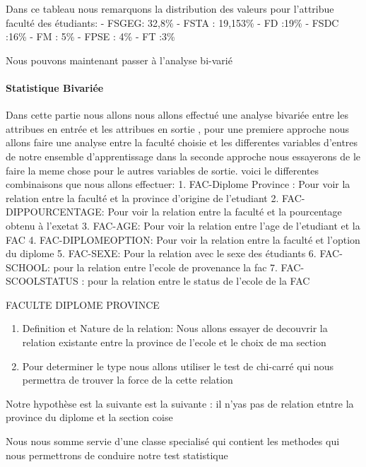 \documentclass[11pt]{article}
\providecommand{\tightlist}{%
      \setlength{\itemsep}{0pt}\setlength{\parskip}{0pt}}
\begin{document}
    Dans ce tableau nous remarquons la distribution des valeurs pour
l'attribue faculté des étudiants: - FSGEG: 32,8\% - FSTA : 19,153\% - FD
:19\% - FSDC :16\% - FM : 5\% - FPSE : 4\% - FT :3\%

    Nous pouvons maintenant passer à l'analyse bi-varié

    \paragraph{Statistique Bivariée}\label{statistique-bivariuxe9e}

    Dans cette partie nous allons nous allons effectué une analyse bivariée
entre les attribues en entrée et les attribues en sortie , pour une
premiere approche nous allons faire une analyse entre la faculté choisie
et les differentes variables d'entres de notre ensemble d'apprentissage
dans la seconde approche nous essayerons de le faire la meme chose pour
le autres variables de sortie. voici le differentes combinaisons que
nous allons effectuer: 1. FAC-Diplome Province : Pour voir la relation
entre la faculté et la province d'origine de l'etudiant 2.
FAC-DIPPOURCENTAGE: Pour voir la relation entre la faculté et la
pourcentage obtenu à l'exetat 3. FAC-AGE: Pour voir la relation entre
l'age de l'etudiant et la FAC 4. FAC-DIPLOMEOPTION: Pour voir la
relation entre la faculté et l'option du diplome 5. FAC-SEXE: Pour la
relation avec le sexe des étudiants 6. FAC-SCHOOL: pour la relation
entre l'ecole de provenance la fac 7. FAC-SCOOLSTATUS : pour la relation
entre le status de l'ecole de la FAC

    FACULTE DIPLOME PROVINCE

    \begin{enumerate}
\def\labelenumi{\arabic{enumi}.}
\tightlist
\item
  Definition et Nature de la relation: Nous allons essayer de decouvrir
  la relation existante entre la province de l'ecole et le choix de ma
  section
\item
  Pour determiner le type nous allons utiliser le test de chi-carré qui
  nous permettra de trouver la force de la cette relation
\end{enumerate}

    Notre hypothèse est la suivante est la suivante : il n'yas pas de
relation etntre la province du diplome et la section coise

    Nous nous somme servie d'une classe specialisé qui contient les methodes
qui nous permettrons de conduire notre test statistique
\end{document}
